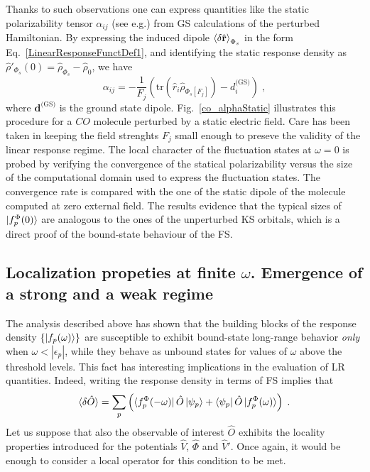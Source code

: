 \documentclass[reprint,aps,prb]{revtex4-1}
\newcommand{\eps}{\epsilon}
\newcommand{\be}{\begin{equation}}
\newcommand{\ee}{\end{equation}}
\newcommand{\lb}{\label}
\newcommand{\op}[1]{\hat {#1}}
\newcommand{\trace}[1]{\mathrm{tr}\left(#1\right)}
\newcommand{\dmnot}{\op{\rho}_0}
\newcommand{\dm}{\op{\rho}}
\begin{document}
Thanks to such observations one can express quantities like the static polarizability tensor $\alpha_{ij}$ (see e.g.\cite{DebElecField}) from GS calculations of the perturbed Hamiltonian.
By expressing the induced dipole $\braket{\delta \op{\mathbf r}}_{\Phi_s}$ in the form Eq.~\eqref{LinearResponseFunctDef1}, and identifying the static response density as $\dm'_{\Phi_s}(0) = \dm_{\Phi_s} -\dmnot $, we have
\be \label{staticalpha}
\alpha_{ij} =
-\frac{1}{F_j} \left(\trace{\op r_i \dm_{\Phi_s[F_j]}} - d^{\text{(GS)}}_i \right)\;,
\ee
where $\mathbf d^\text{(GS)}$ is the ground state dipole.
Fig.~\eqref{co_alphaStatic} illustrates this procedure for a $CO$ molecule
perturbed by a static electric field.
Care has been taken in keeping the field strenghts $F_j$ small enough to
preseve the validity of the linear response regime.
The local character of the fluctuation states at $\omega=0$ is
probed by verifying the convergence of the statical polarizability versus
the size of the computational domain used to express the fluctuation states. The convergence rate is compared with the
one of the static dipole of the molecule computed at zero external field.
The results evidence that the typical sizes of $\ket{f^\Phi_p(0)}$ are analogous to the ones of the unperturbed KS orbitals, which is a direct proof of the bound-state behaviour of the FS.


\subsection{Localization propeties at finite $\omega$. Emergence of a strong and a weak regime}


The analysis described above has shown that the building blocks of the response density $\{\ket{f_p(\omega)}\}$
are susceptible to exhibit bound-state long-range behavior \emph{only} when $\omega < |\eps_p|$,
while they behave as unbound states for values of $\omega$ above the threshold levels.
This fact has interesting implications in the evaluation of LR quantities. Indeed, writing the response
density in terms of FS implies that 
\be\lb{LinearResponseFunctDef2}
\braket{\delta\op O} = \sum_p \left( \bra{f_p^\Phi(-\omega)}\op O\ket{\psi_p}+ \bra{\psi_p}\op O\ket{f_p^\Phi(\omega)}\right) \;.
\ee
Let us suppose that also the observable of interest $\op O$ exhibits the locality properties introduced for the potentials $ \op V$, $\op \Phi$ and $\op V'$.
Once again, it would be enough to consider a local operator for this condition to be met.
\end{document}
